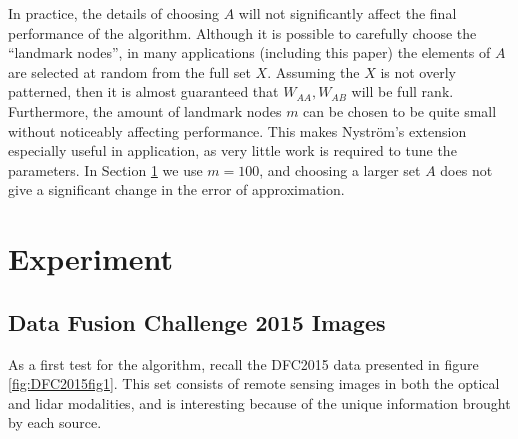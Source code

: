 \documentclass[journal]{IEEEtran}
\begin{document}
In practice, the details of choosing $A$ will not significantly affect the final
performance of the algorithm. Although it is possible to carefully choose the 
``landmark nodes'', in many applications (including this paper) the elements of
$A$ are selected at random from the full set $X$. Assuming the $X$ is not overly
patterned, then it is almost guaranteed that $W_{AA},W_{AB}$ will be full
rank. Furthermore, the amount of landmark nodes $m$ can be chosen to be quite
small without noticeably affecting performance. This makes Nystr\"{o}m's
extension especially useful in application, as very little work is required to
tune the parameters.  In Section \ref{sec:experiment} we use $m = 100$, and
choosing a larger set $A$ does not give a significant change in the error of
approximation.

\section{Experiment}
\label{sec:experiment}

\subsection{Data Fusion Challenge 2015 Images}
\label{sec:DFC2015experiment}

As a first test for the algorithm, recall the DFC2015 data presented in figure
\ref{fig:DFC2015fig1}. This set consists of remote sensing images in both the
optical and lidar modalities, and is interesting because of the unique
information brought by each source.
\end{document}
